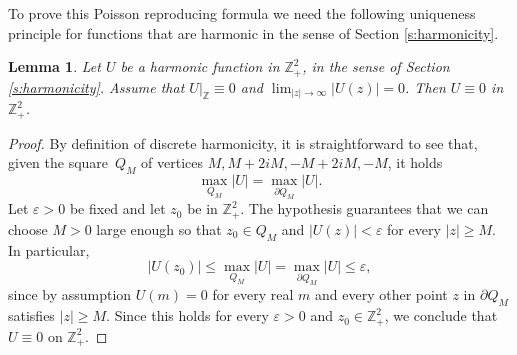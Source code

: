 \documentclass[12pt,a4paper,reqno]{amsart}
\newtheorem{lem}[thm]{Lemma}
\theoremstyle{definition}
\theoremstyle{definition}\newtheorem{defn}[thm]{Definition}
\begin{document}
    To prove this Poisson reproducing formula we need the following  uniqueness principle for functions that are harmonic in the sense  of Section \ref{s:harmonicity}. 
    \begin{lem}\label{l:uniqueness_harmonic}
    Let $U$ be a harmonic  function in $\mathbb Z^2_+$, in the sense of Section \ref{s:harmonicity}. Assume that
    $
    U|_{\mathbb Z}\equiv 0$ and $ \lim_{|z|\to\infty}|U(z)|=0$. Then $U\equiv 0$ in $\mathbb Z^2_+$.  
    \end{lem}
    
    \begin{proof}
    By definition of discrete harmonicity, it is straightforward to see that, given the square~$Q_M$ of vertices $M, M+2iM, -M+2iM, -M$, it holds
    \[
    \max_{Q_M}|U|=\max_{\partial Q_{M}}|U|.
    \]
    Let $\varepsilon>0$ be fixed and let  $z_0$ be in $\mathbb Z^2_+$. The hypothesis guarantees that we can choose $M>0$ large enough so that $z_0\in Q_M$ and $|U(z)|<\varepsilon$ for every $|z|\geqslant M$. In particular,
    \[
    |U(z_0)|\leqslant \max_{Q_M} |U|=\max_{\partial Q_M}|U| \leqslant \varepsilon,
    \]
    since by assumption $U(m)=0$ for every real $m$ and every other point $z$ in $\partial Q_M$  satisfies $|z|\geqslant M$. Since this holds for every $\varepsilon>0$ and $z_0\in\mathbb{Z}^2_+$, we conclude that $U\equiv 0$ on $\mathbb{Z}^2_+$.
    \end{proof}%
\end{document}

